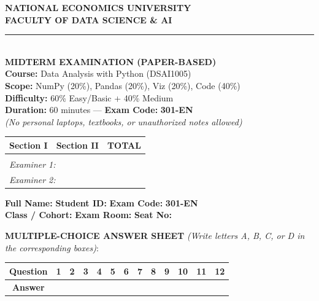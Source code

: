 \documentclass[11pt,a4paper]{article}
\begin{document}
\noindent
\begin{minipage}[t]{0.54\textwidth}
  \textbf{NATIONAL ECONOMICS UNIVERSITY}\\
  \textbf{FACULTY OF DATA SCIENCE \& AI}\\
  \rule{4.5cm}{0.4pt}\\[1.5mm]
  \textbf{MIDTERM EXAMINATION (PAPER-BASED)}\\
  \textbf{Course:} Data Analysis with Python (DSAI1005)\\
  \textbf{Scope:} NumPy (20\%), Pandas (20\%), Viz (20\%), Code (40\%)\\
  \textbf{Difficulty:} 60\% Easy/Basic + 40\% Medium\\
  \textbf{Duration:} 60 minutes --- \textbf{Exam Code:} \textbf{301-EN}\\
  \textit{\small (No personal laptops, textbooks, or unauthorized notes allowed)}
\end{minipage}
\hfill
\begin{minipage}[t]{0.43\textwidth}
  \begin{tabular}{|p{2.1cm}|p{2.1cm}|p{2.1cm}|}
    \hline
    \centering \textbf{Section I} & \centering \textbf{Section II} & \centering \textbf{TOTAL} \tabularnewline
    \hline
    & & \\[0.8cm]
    \hline
    \multicolumn{3}{|l|}{\small \textit{Examiner 1:}} \tabularnewline
    \multicolumn{3}{|l|}{\small \textit{Examiner 2:}} \tabularnewline
    \hline
  \end{tabular}
\end{minipage}

\vspace{2mm}
\noindent
\textbf{Full Name:} \dotfill{} \textbf{Student ID:} \dotfill{} \textbf{Exam Code:} \textbf{301-EN}\\
\textbf{Class / Cohort:} \dotfill{} \textbf{Exam Room:} \dotfill{} \textbf{Seat No:} \dotfill

\vspace{2mm}
\noindent
\textbf{MULTIPLE-CHOICE ANSWER SHEET} \textit{(Write letters A, B, C, or D in the corresponding boxes)}:
\begin{center}
\small
\begin{tabular}{|c|c|c|c|c|c|c|c|c|c|c|c|c|}
  \hline
  \textbf{Question} & \textbf{1} & \textbf{2} & \textbf{3} & \textbf{4} & \textbf{5} & \textbf{6} & \textbf{7} & \textbf{8} & \textbf{9} & \textbf{10} & \textbf{11} & \textbf{12} \\
  \hline
  \textbf{Answer} & & & & & & & & & & & & \\[3.5mm]
  \hline
\end{tabular}
\end{center}
\end{document}
